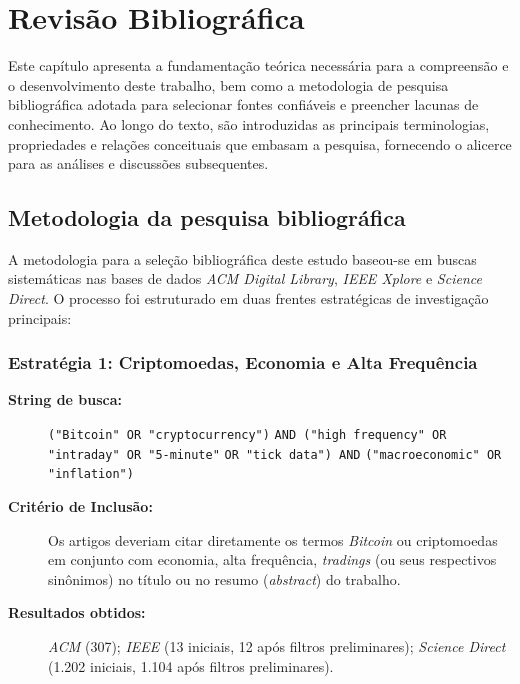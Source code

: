\documentclass[
    12pt,                %
    openright,           %
    oneside,             %
    a4paper,             %
    english,             %
    brazil               %
]{abntex2}
\begin{document}
\chapter{Revisão Bibliográfica}
\label{cap:revisao}

Este capítulo apresenta a fundamentação teórica necessária para a compreensão e
o desenvolvimento deste trabalho, bem como a metodologia de pesquisa bibliográfica
adotada para selecionar fontes confiáveis e preencher lacunas de conhecimento. Ao longo
do texto, são introduzidas as principais terminologias, propriedades e relações conceituais
que embasam a pesquisa, fornecendo o alicerce para as análises e discussões subsequentes.

\section{Metodologia da pesquisa bibliográfica}

A metodologia para a seleção bibliográfica deste estudo baseou-se em buscas sistemáticas nas bases de dados \textit{ACM Digital Library}, \textit{IEEE Xplore} e 
\textit{Science Direct}. O processo foi estruturado em duas frentes estratégicas de investigação principais:

\subsection{Estratégia 1: Criptomoedas, Economia e Alta Frequência}
\begin{description}
    \item[\textbf{String de busca:}] \texttt{("Bitcoin" OR "cryptocurrency")} \texttt{AND ("high frequency" OR} \texttt{"intraday" OR "5-minute"} \texttt{OR "tick data") AND} \texttt{("macroeconomic" OR "inflation")}
    \item[\textbf{Critério de Inclusão:}] Os artigos deveriam citar diretamente os termos \textit{Bitcoin} ou criptomoedas em conjunto com economia, alta frequência, \textit{tradings} (ou seus respectivos sinônimos) no título ou no resumo (\textit{abstract}) do trabalho.
    \item[\textbf{Resultados obtidos:}] \textit{ACM} (307); \textit{IEEE} (13 iniciais, 12 após filtros preliminares); \textit{Science Direct} (1.202 iniciais, 1.104 após filtros preliminares).
\end{description}
\end{document}
